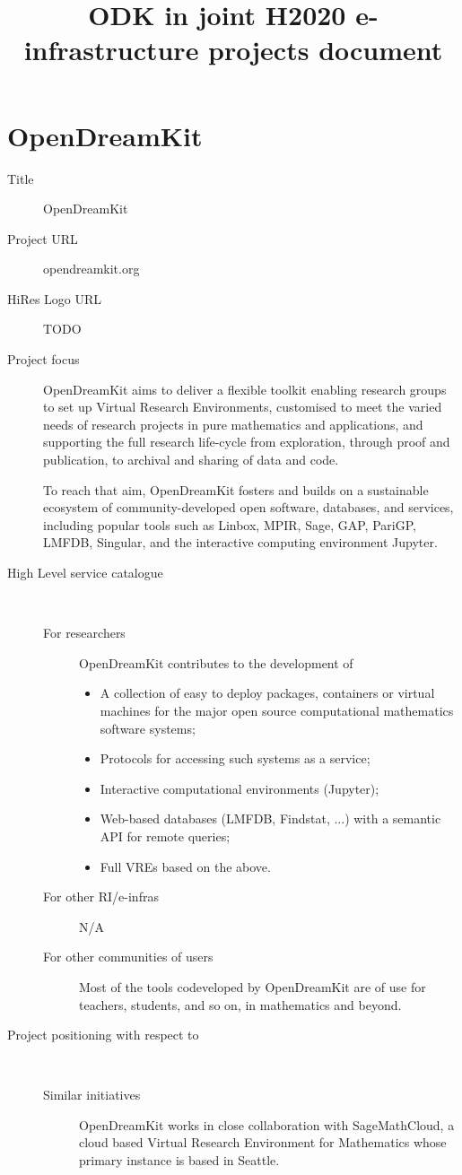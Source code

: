 \documentclass[12pta4wide]{amsart}
\title{ODK in joint H2020 e-infrastructure projects document}
\begin{document}
\section{OpenDreamKit}

\begin{description}
\item[Title] OpenDreamKit
\item[Project URL] opendreamkit.org
\item[HiRes Logo URL] TODO
\item[Project focus]

  OpenDreamKit aims to deliver a flexible toolkit enabling research
  groups to set up Virtual Research Environments, customised to meet
  the varied needs of research projects in pure mathematics and
  applications, and supporting the full research life-cycle from
  exploration, through proof and publication, to archival and sharing
  of data and code.

  To reach that aim, OpenDreamKit fosters and builds on a sustainable
  ecosystem of community-developed open software, databases, and
  services, including popular tools such as Linbox, MPIR, Sage, GAP,
  PariGP, LMFDB, Singular, and the interactive computing environment
  Jupyter.

\item[High Level service catalogue]\ 
  \begin{description}
  \item[For researchers]
    OpenDreamKit contributes to the development of
    \begin{itemize}
    \item A collection of easy to deploy packages, containers or
      virtual machines for the major open source computational
      mathematics software systems;
    \item Protocols for accessing such systems as a service;
    \item Interactive computational environments (Jupyter);
    \item Web-based databases (LMFDB, Findstat, ...) with a semantic
      API for remote queries; 
    \item Full VREs based on the above.
    \end{itemize}
  \item[For other RI/e-infras]
    N/A
  \item[For other communities of users] Most of the tools codeveloped
    by OpenDreamKit are of use for teachers, students, and so on, in
    mathematics and beyond.
  \end{description}
\item[Project positioning with respect to]\ 
  \begin{description}
  \item[Similar initiatives] OpenDreamKit works in close collaboration
    with SageMathCloud, a cloud based Virtual Research Environment for
    Mathematics whose primary instance is based in Seattle.


\end{description}
\end{description}
\end{document}
